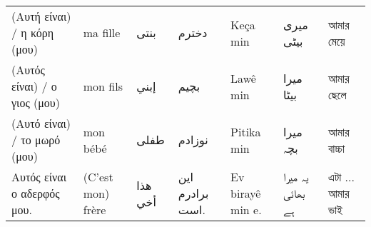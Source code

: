 \begin{longtable}{p{3.5cm} p{3.5cm} p{3.5cm} p{3.5cm} p{3.5cm} p{3.5cm} p{3.5cm} }
 (Αυτή είναι)  / η κόρη (μου)                                                                                                  & ma fille                                                                                        & بنتی                                                                                  & دخترم                                                       & Keça min                                                                           & میری بیٹی                                                                      & আমার মেয়ে                                                         \\
 (Αυτός είναι)  / ο γιος (μου)                                                                                                 & mon fils                                                                                        & إبني                                                                                  & بچیم                                                        & Lawê min                                                                           & میرا بیٹا                                                                      & আমার ছেলে                                                         \\
 (Αυτό είναι)  / το μωρό (μου)                                                                                                 & mon bébé                                                                                        & طفلی                                                                                  & نوزادم                                                      & Pitika min                                                                         & میرا  بچہ                                                                      & আমার বাচ্চা                                                       \\
 Αυτός είναι ο αδερφός μου.                                                                                                    & (C'est mon) frère                                                                               & هذا أخي                                                                               & این برادرم است.                                             & Ev birayê min e.                                                                   & یہ میرا بھائی ہے                                                               & এটা ... আমার ভাই                                                  \\

\end{longtable}
